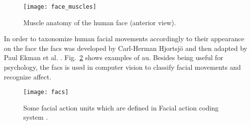 \begin{figure}
    \centering
    \texttt{[image: face\_muscles]}
    \caption{Muscle anatomy of the human face (anterior view).\cite{Prendergast2013anatomy}}
    \label{fig:facemuscles}
\end{figure}

In order to taxonomize human facial movements accordingly to their appearance on the face the \gls{facs} was developed by Carl-Herman Hjortsj{\"{o}} and then adapted by Paul Ekman et al. \cite{Ekman1977}. Fig.~\ref{fig:facs} shows examples of \gls{au}. Besides being useful for psychology, the \gls{facs} is used in computer vision to classify facial movements and recognize affect.  


\begin{figure}
    \centering
    \texttt{[image: facs]}
    \caption{Some facial action units which are defined in Facial action coding system \cite{Ekman1977}.}
    \label{fig:facs}
\end{figure}

















